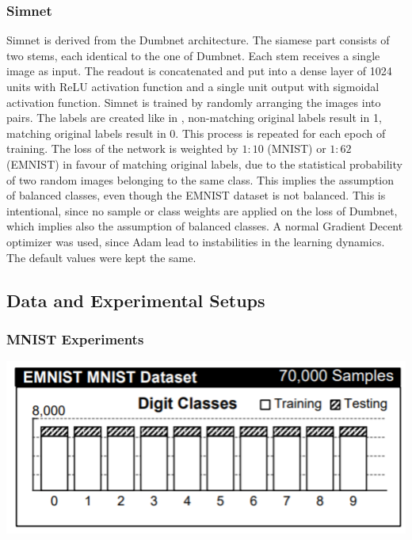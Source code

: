 ﻿\documentclass[a4paper,pt12]{article}
\begin{document}
\subsubsection{Simnet}
Simnet is derived from the Dumbnet architecture. The siamese part consists of two stems, each identical to the one of Dumbnet. Each stem receives a single image as input. The readout is concatenated and put into a dense layer of 1024 units with ReLU activation function and a single unit output with sigmoidal activation function. \newline
Simnet is trained by randomly arranging the images into pairs. The labels are created like in \cite{siamese}, non-matching original labels result in 1, matching original labels result in 0. This process is repeated for each epoch of training. \newline
The loss of the network is weighted by $1:10$ (MNIST) or $1:62$ (EMNIST) in favour of matching original labels, due to the statistical probability of two random images belonging to the same class. This implies the assumption of balanced classes, even though the EMNIST dataset is not balanced. This is intentional, since no sample or class weights are applied on the loss of Dumbnet, which implies also the assumption of balanced classes. \newline
A normal Gradient Decent optimizer was used, since Adam lead to instabilities in the learning dynamics. The default values were kept the same.


\subsection{Data and Experimental Setups}

\subsubsection{MNIST Experiments}

\includegraphics[scale=0.8]{mnist.png}
\end{document}
